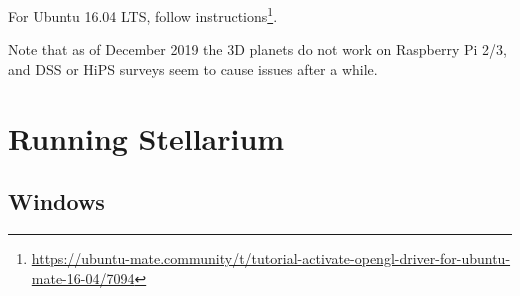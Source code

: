For Ubuntu 16.04 LTS, follow instructions\footnote{\url{https://ubuntu-mate.community/t/tutorial-activate-opengl-driver-for-ubuntu-mate-16-04/7094}}. 
	
Note that as of December 2019 the 3D planets do not work on Raspberry Pi 2/3, and DSS or HiPS surveys seem to cause issues after a while.
	

\section{Running Stellarium}
\label{sec:GettingStarted:Running}

\subsection{Windows}
\label{sec:GettingStarted:Running:Windows}

